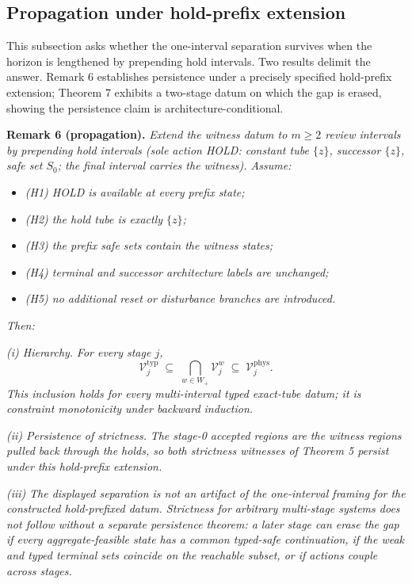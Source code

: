 \documentclass[review,11pt]{elsarticle}
\providecommand{\tightlist}{\setlength{\itemsep}{0pt}\setlength{\parskip}{0pt}}
\begin{document}
\subsection{Propagation under hold-prefix
extension}\label{propagation-under-hold-prefix-extension}

This subsection asks whether the one-interval separation survives when
the horizon is lengthened by prepending hold intervals. Two results
delimit the answer. Remark 6 establishes persistence under a precisely
specified hold-prefix extension; Theorem 7 exhibits a two-stage datum on
which the gap is erased, showing the persistence claim is
architecture-conditional.

\textbf{Remark 6 (propagation).} \emph{Extend the witness datum to
\(m \ge 2\) review intervals by prepending hold intervals (sole action
HOLD: constant tube \(\{z\}\), successor \(\{z\}\), safe set \(S_0\);
the final interval carries the witness). Assume:}

\begin{itemize}
\tightlist
\item
  \emph{(H1) HOLD is available at every prefix state;}
\item
  \emph{(H2) the hold tube is exactly \(\{z\}\);}
\item
  \emph{(H3) the prefix safe sets contain the witness states;}
\item
  \emph{(H4) terminal and successor architecture labels are unchanged;}
\item
  \emph{(H5) no additional reset or disturbance branches are
  introduced.}
\end{itemize}

\emph{Then:}

\emph{(i) Hierarchy.} \emph{For every stage \(j\),}
\[\mathcal{V}^{\mathrm{typ}}_j \;\subseteq\; \bigcap_{w \in W_+} \mathcal{V}^{w}_j \;\subseteq\; \mathcal{V}^{\mathrm{phys}}_j.\]
\emph{This inclusion holds for every multi-interval typed exact-tube
datum; it is constraint monotonicity under backward induction.}

\emph{(ii) Persistence of strictness.} \emph{The stage-0 accepted
regions are the witness regions pulled back through the holds, so both
strictness witnesses of Theorem 5 persist under this hold-prefix
extension.}

\emph{(iii)} \emph{The displayed separation is not an artifact of the
one-interval framing for the constructed hold-prefixed datum. Strictness
for arbitrary multi-stage systems does not follow without a separate
persistence theorem: a later stage can erase the gap if every
aggregate-feasible state has a common typed-safe continuation, if the
weak and typed terminal sets coincide on the reachable subset, or if
actions couple across stages.}
\end{document}
